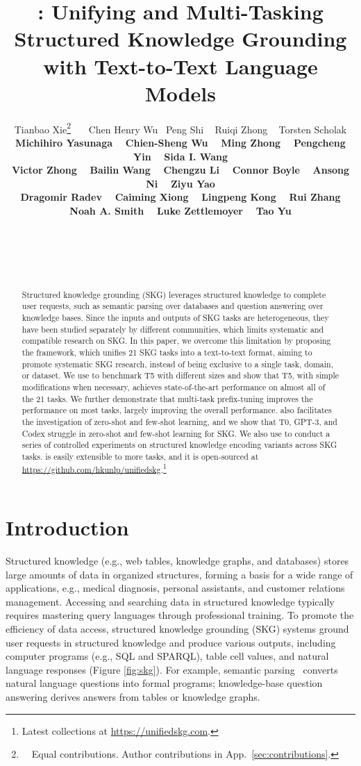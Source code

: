 \documentclass[11pt]{article}
\title{
\uskg: Unifying and Multi-Tasking Structured Knowledge Grounding with Text-to-Text Language Models
}
\author{
{\normalsize 
Tianbao Xie\thanks{\ \ Equal contributions. 
Author contributions in App.~\ref{sec:contributions}.}\ \  ~ Chen Henry Wu\footnotemark[1]  ~ Peng Shi ~ Ruiqi Zhong ~ Torsten Scholak \vspace{0.2mm} 
}\\ 
{\normalsize\bf Michihiro Yasunaga ~ Chien-Sheng Wu ~ Ming Zhong ~ Pengcheng Yin ~ Sida I. Wang \vspace{0.2mm}
}\\
{\normalsize\bf Victor Zhong ~ Bailin Wang ~ Chengzu Li ~ Connor Boyle ~ Ansong Ni ~ Ziyu Yao 
\vspace{0.2mm}
}\\ 
{\normalsize\bf Dragomir Radev ~ Caiming Xiong ~ Lingpeng Kong ~ Rui Zhang
\vspace{0.2mm}
}\\
{\normalsize\bf Noah A. Smith ~ Luke Zettlemoyer ~ Tao Yu
\vspace{0.2mm}
}
\\
\affaddr{\normalsizeThe University of Hong Kong \ \ \ \ } 
\affaddr{\normalsizeCarnegie Mellon University\ \ \ \ }
\affaddr{\normalsizeUniversity of Waterloo} \\
\affaddr{\normalsizeUC Berkeley\ \ \ \ }
\affaddr{\normalsizeServiceNow Research\ \ \ \ }
\affaddr{\normalsizeStanford University\ \ \ \ } 
\affaddr{\normalsizeSalesforce Research} \\
\affaddr{\normalsizeUIUC\ \ \ \ }
\affaddr{\normalsizeGoogle Research\ \ \ \ }
\affaddr{\normalsizeFacebook AI Research\ \ \ \ } 
\affaddr{\normalsizeUniversity of Edinburgh} \\
\affaddr{\normalsizeShanghai AI Lab\ \ }
\affaddr{\normalsizeYale University\ \ }
\affaddr{\normalsizeGeorge Mason University\ \ } 
\affaddr{\normalsizePenn State University} \\
\affaddr{\normalsizeAllen Institute for Artificial Intelligence \ \ \ \ } 
\affaddr{\normalsizeUniversity of Washington}
}
\newcommand{\skg}{SKG\xspace}
\newcommand{\ntasks}{21\xspace}
\begin{document}
\maketitle

\begin{abstract}

Structured knowledge grounding (SKG) leverages structured knowledge to complete user requests, such as semantic parsing over databases and question answering over knowledge bases. 
Since the inputs and outputs of SKG tasks are heterogeneous, they have been studied separately by different communities, which limits systematic and compatible research on \skg. 
In this paper, we overcome this limitation by proposing the \uskg framework, which unifies \ntasks SKG tasks into a text-to-text format, aiming to promote systematic SKG research, instead of being exclusive to a single task, \mbox{domain}, or dataset.
We use \uskg to benchmark T5 with different sizes and show that T5, with simple modifications when necessary, achieves state-of-the-art performance on almost all of the \ntasks tasks. 
We further demonstrate that multi-task prefix-tuning improves the performance on most tasks, largely improving the overall performance. 
\uskg also facilitates the investigation of zero-shot and few-shot learning, and we show that T0, GPT-3, and Codex struggle in zero-shot and few-shot learning for SKG. 
We also use \uskg to conduct a series of controlled experiments on structured knowledge encoding variants across \skg tasks. 
\uskg is easily extensible to more tasks, and it is open-sourced at \url{https://github.com/hkunlp/unifiedskg}.\footnote{Latest collections at \url{https://unifiedskg.com}.}

\end{abstract}

\section{Introduction}

Structured knowledge (e.g., web tables, knowledge graphs, and databases) stores large amounts of data in organized structures, forming a basis for a wide range of applications, e.g., medical diagnosis, personal assistants, and customer relations management.
Accessing and searching data in structured knowledge typically requires mastering query languages through professional training.
To promote the efficiency of data access, structured knowledge grounding (\skg) systems ground user requests in structured knowledge and produce various outputs, including computer programs (e.g., SQL and SPARQL), table cell values, and natural language responses (Figure \ref{fig:skg}). 
For example, semantic parsing~\cite{ZelleM96,Zettlemoyer05} converts natural language questions into formal programs;
knowledge-base question answering \cite{BerantCFL13} derives answers from tables or knowledge graphs.
\end{document}
